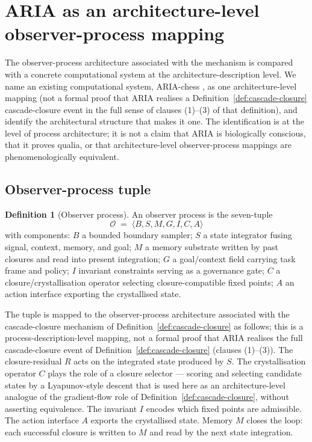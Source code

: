 \documentclass[11pt]{article}
\theoremstyle{definition}
\newtheorem{definition}[theorem]{Definition}
\newcommand{\Ocal}{\mathcal{O}}
\begin{document}
\section{ARIA as an architecture-level observer-process mapping}\label{sec:aria}

The observer-process architecture associated with the mechanism
is compared with a concrete computational system at the
architecture-description level. We name an
existing computational system, ARIA-chess
\cite{ariaChessRepo, SmartARIAChess}, as one architecture-level
mapping (not a formal proof that ARIA realises a
Definition~\ref{def:cascade-closure} cascade-closure event in the
full sense of clauses (1)--(3) of that definition), and
identify the architectural structure that makes it one. The
identification is at the level of process architecture; it is not a
claim that ARIA is biologically conscious, that it proves qualia, or
that architecture-level observer-process mappings are phenomenologically equivalent.

\subsection{Observer-process tuple}

\begin{definition}[Observer process]\label{def:observer-process}
An observer process is the seven-tuple
\begin{equation}\label{eq:O-tuple}
   \Ocal \;=\; \langle B, S, M, G, I, C, A \rangle
\end{equation}
with components: $B$ a bounded boundary sampler; $S$ a state integrator
fusing signal, context, memory, and goal; $M$ a memory substrate
written by past closures and read into present integration; $G$ a
goal/context field carrying task frame and policy; $I$ invariant
constraints serving as a governance gate; $C$ a closure/crystallisation
operator selecting closure-compatible fixed points; $A$ an action
interface exporting the crystallised state.
\end{definition}

The tuple is mapped to the observer-process architecture associated
with the cascade-closure mechanism of
Definition~\ref{def:cascade-closure} as follows; this is a
process-description-level mapping, not a formal proof that ARIA
realises the full cascade-closure event of
Definition~\ref{def:cascade-closure} (clauses (1)--(3)). The closure-residual
$R$ acts on the integrated state produced by $S$. The crystallisation
operator $C$ plays the role of a closure selector --- scoring and
selecting candidate states by a Lyapunov-style descent that is
used here as an architecture-level analogue of the gradient-flow
role of Definition~\ref{def:cascade-closure}, without asserting
equivalence. The invariant $I$ encodes which fixed
points are admissible. The action interface $A$ exports the
crystallised state. Memory $M$ closes the loop: each successful
closure is written to $M$ and read by the next state integration.
\end{document}
